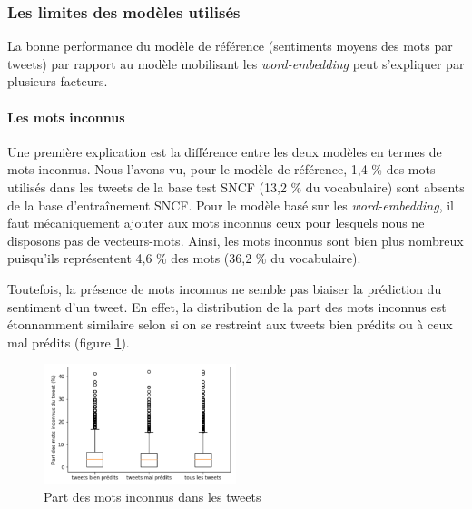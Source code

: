 \documentclass[11pt,french,french]{article}
\begin{document}
\hypertarget{les-limites-des-moduxe8les-utilisuxe9s}{%
\subsubsection{Les limites des modèles utilisés}\label{les-limites-des-moduxe8les-utilisuxe9s}}

La bonne performance du modèle de référence (sentiments moyens des mots par tweets) par rapport au modèle mobilisant les \emph{word-embedding} peut s'expliquer par plusieurs facteurs.

\hypertarget{les-mots-inconnus}{%
\paragraph{Les mots inconnus}\label{les-mots-inconnus}}

Une première explication est la différence entre les deux modèles en termes de mots inconnus.
Nous l'avons vu, pour le modèle de référence, 1,4 \% des mots utilisés dans les tweets de la base test SNCF (13,2 \% du vocabulaire) sont absents de la base d'entraînement SNCF.
Pour le modèle basé sur les \emph{word-embedding}, il faut mécaniquement ajouter aux mots inconnus ceux pour lesquels nous ne disposons pas de vecteurs-mots.
Ainsi, les mots inconnus sont bien plus nombreux puisqu'ils représentent 4,6 \% des mots (36,2 \% du vocabulaire).

Toutefois, la présence de mots inconnus ne semble pas biaiser la prédiction du sentiment d'un tweet.
En effet, la distribution de la part des mots inconnus est étonnamment similaire selon si on se restreint aux tweets bien prédits ou à ceux mal prédits (figure \ref{fig:mots_inconnus}).

\begin{figure}[ht]
\begin{center}
\includegraphics[width=0.5\textwidth]{img/mots_inconnus.png}
\captionsetup{margin=0cm,format=hang,justification=justified}
\caption{Part des mots inconnus dans les tweets}\label{fig:mots_inconnus}
\end{center}
\end{figure}
\end{document}

